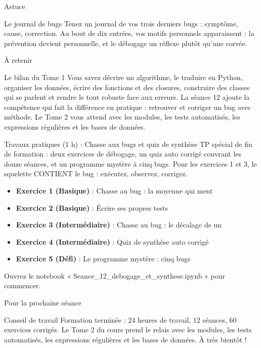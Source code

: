 \documentclass[aspectratio=169,11pt]{beamer}
\begin{document}
\begin{frame}{Astuce}
\begin{exampleblock}{Le journal de bugs}
Tenez un journal de vos trois derniers bugs : symptôme, cause, correction. Au bout de dix entrées, vos motifs personnels apparaissent : la prévention devient personnelle, et le débogage un réflexe plutôt qu'une corvée.
\end{exampleblock}
\end{frame}

\begin{frame}{À retenir}
\begin{block}{Le bilan du Tome 1}
Vous savez décrire un algorithme, le traduire en Python, organiser les données, écrire des fonctions et des closures, construire des classes qui se parlent et rendre le tout robuste face aux erreurs. La séance 12 ajoute la compétence qui fait la différence en pratique : retrouver et corriger un bug avec méthode. Le Tome 2 vous attend avec les modules, les tests automatisés, les expressions régulières et les bases de données.
\end{block}
\end{frame}

\begin{frame}{Travaux pratiques (1 h) : Chasse aux bugs et quiz de synthèse}
TP spécial de fin de formation : deux exercices de débogage, un quiz auto corrigé couvrant les douze séances, et un programme mystère à cinq bugs. Pour les exercices 1 et 3, le squelette CONTIENT le bug : exécutez, observez, corrigez.

\begin{itemize}
  \setlength{\itemsep}{1.5pt}\setlength{\parskip}{0pt}
  \item \textbf{Exercice 1 (Basique)} : Chasse au bug : la moyenne qui ment
  \item \textbf{Exercice 2 (Basique)} : Écrire ses propres tests
  \item \textbf{Exercice 3 (Intermédiaire)} : Chasse au bug : le décalage de un
  \item \textbf{Exercice 4 (Intermédiaire)} : Quiz de synthèse auto corrigé
  \item \textbf{Exercice 5 (Défi)} : Le programme mystère : cinq bugs
\end{itemize}
\vspace{4pt}

{\small\color{PyGris}Ouvrez le notebook « Seance\_12\_debogage\_et\_synthese.ipynb » pour commencer.}
\end{frame}
\begin{frame}{Pour la prochaine séance}
\begin{exampleblock}{Conseil de travail}
Formation terminée : 24 heures de travail, 12 séances, 60 exercices corrigés. Le Tome 2 du cours prend le relais avec les modules, les tests automatisés, les expressions régulières et les bases de données. À très bientôt !
\end{exampleblock}
\end{frame}
\end{document}
